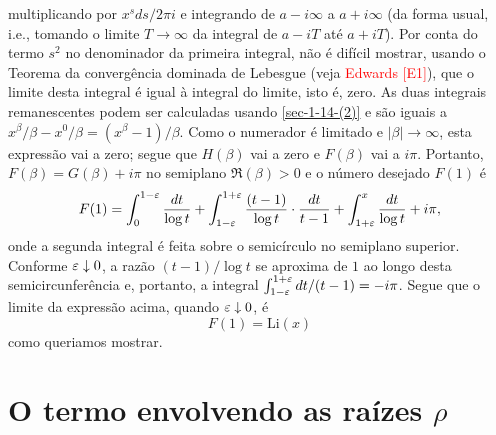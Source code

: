     multiplicando por $x^s ds/2\pi i$ e integrando de $a - i\infty$ a $a + i \infty$ (da forma usual, i.e., tomando o limite $T \to \infty$ da integral de $a - iT$ até $a + iT$). Por conta do termo $s^2$ no denominador da primeira integral, não é difícil mostrar, usando o Teorema da convergência dominada de Lebesgue (veja \textcolor{red}{Edwards [E1]}), que o limite desta integral é igual à integral do limite, isto é, zero. As duas integrais remanescentes podem ser calculadas usando \eqref{sec-1-14-(2)} e são iguais a $x^{\beta}/\beta - x^{0}/\beta = (x^{\beta} - 1)/\beta$. Como o numerador é limitado e $|\beta| \to \infty$, esta expressão vai a zero; segue que $H(\beta)$ vai a zero e $F(\beta)$ vai a $i\pi$. Portanto, $F(\beta) = G(\beta) + i\pi$ no semiplano $\Re(\beta) > 0$ e o número desejado $F(1)$ é 
    \begin{equation*}
        F(1) = \int_{0}^{1 - \varepsilon} \frac{dt}{\log t} + \int_{1 - \varepsilon}^{1 + \varepsilon} \frac{(t-1)}{\log t} \cdot \frac{dt}{t-1} + \int_{1 + \varepsilon}^{x} \frac{dt}{\log t} + i\pi,
    \end{equation*}
    onde a segunda integral é feita sobre o semicírculo no semiplano superior. Conforme $\varepsilon \downarrow 0$, a razão $(t-1)/ \log t$ se aproxima de $1$ ao longo desta semicircunferência e, portanto, a integral $\int_{1 - \varepsilon}^{1 + \varepsilon} dt/(t-1) = - i\pi$. Segue que o limite da expressão acima, quando $\varepsilon \downarrow 0$, é
    \begin{equation*}
        F(1) = \text{Li}(x)
    \end{equation*}
    como queriamos mostrar.
    
    
    \section{O termo envolvendo as raízes $\rho$}
    
